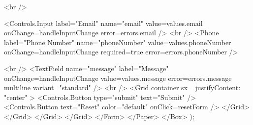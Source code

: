 {                <br />

                <Controls.Input
                  label="Email"
                  name="email"
                  value={values.email}
                  onChange={handleInputChange}
                  error={errors.email}
                />
                <br />
                <Phone
                  label="Phone Number"
                  name="phoneNumber"
                  value={values.phoneNumber}
                  onChange={handleInputChange}
                  required={true}
                  error={errors.phoneNumber}
                />

                <br />
                <TextField
                  name="message"
                  label="Message"
                  onChange={handleInputChange}
                  value={values.message}
                  error={errors.message}
                  multiline
                  variant="standard"
                />
                <br />
                <Grid container sx={{ justifyContent: "center" }}>
                  <Controls.Button type="submit" text="Submit" />
                  <Controls.Button
                    text="Reset"
                    color="default"
                    onClick={resetForm}
                  />
                </Grid>
              </Grid>
            </Grid>
          </Grid>
        </Form>
      </Paper>
    </Box>
  );
}
